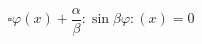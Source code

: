 \begin{equation}
\square\varphi(x)+\frac{\alpha}{\beta}:\!\sin\beta\varphi\!:(x)=0 \label{e}%
\end{equation}

